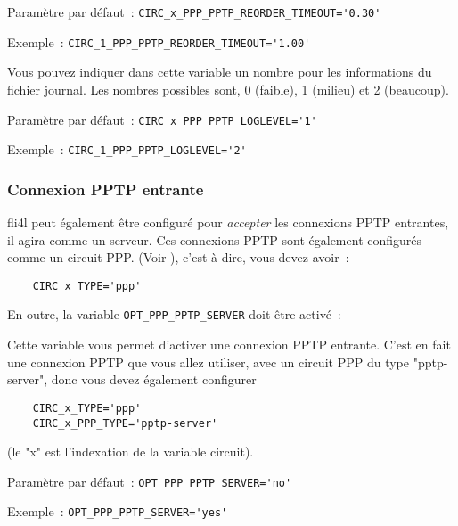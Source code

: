 \begin{description}
Paramètre par défaut~: \verb+CIRC_x_PPP_PPTP_REORDER_TIMEOUT='0.30'+

Exemple~: \verb+CIRC_1_PPP_PPTP_REORDER_TIMEOUT='1.00'+


Vous pouvez indiquer dans cette variable un nombre pour les informations du fichier
journal. Les nombres possibles sont, 0 (faible), 1 (milieu) et 2 (beaucoup).

Paramètre par défaut~: \verb+CIRC_x_PPP_PPTP_LOGLEVEL='1'+

Exemple~: \verb+CIRC_1_PPP_PPTP_LOGLEVEL='2'+

\end{description}

\subsubsection{Connexion PPTP entrante}

fli4l peut également être configuré pour \emph{accepter}  les connexions PPTP
entrantes, il agira comme un serveur. Ces connexions PPTP sont également configurés
comme un circuit PPP. (Voir ),
c'est à dire, vous devez avoir~:

\begin{example}
\begin{verbatim}
    CIRC_x_TYPE='ppp'
\end{verbatim}
\end{example}

En outre, la variable \verb+OPT_PPP_PPTP_SERVER+ doit être activé~:

\begin{description}

Cette variable vous permet d'activer une connexion PPTP entrante. C'est en fait
une connexion PPTP que vous allez utiliser, avec un circuit PPP du type "pptp-server",
donc vous devez également configurer

\begin{example}
\begin{verbatim}
    CIRC_x_TYPE='ppp'
    CIRC_x_PPP_TYPE='pptp-server'
\end{verbatim}
\end{example}

(le "x" est l'indexation de la variable circuit).

Paramètre par défaut~: \verb+OPT_PPP_PPTP_SERVER='no'+

Exemple~: \verb+OPT_PPP_PPTP_SERVER='yes'+
\end{description}


